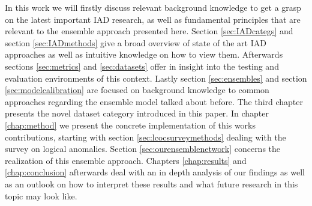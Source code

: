In this work we will firstly discuss relevant background knowledge to get a grasp on the latest important IAD research, as well as fundamental principles that are relevant to the ensemble 
approach presented here. Section \ref{sec:IADcategs} and section \ref{sec:IADmethods} give a broad overview of state of the art IAD approaches as well as intuitive knowledge on how to 
view them. Afterwards sections \ref{sec:metrics} and \ref{sec:datasets} offer in insight into the testing and evaluation environments of this context. Lastly section \ref{sec:ensembles} and 
section \ref{sec:modelcalibration} are focused on background knowledge to common approaches regarding the ensemble model talked about before.\newline
The third chapter presents the novel dataset category introduced in this paper.
In chapter \ref{chap:method} we present the concrete implementation of this works contributions, starting with section \ref{sec:lcocsurveymethods} dealing with the survey on logical anomalies. 
Section \ref{sec:ourensemblenetwork} concerns the realization of this ensemble approach.
\newline 
Chapters \ref{chap:results} and \ref{chap:conclusion} afterwards deal with an in depth analysis of our findings as well as an outlook on how to interpret these results and what future research 
in this topic may look like.






